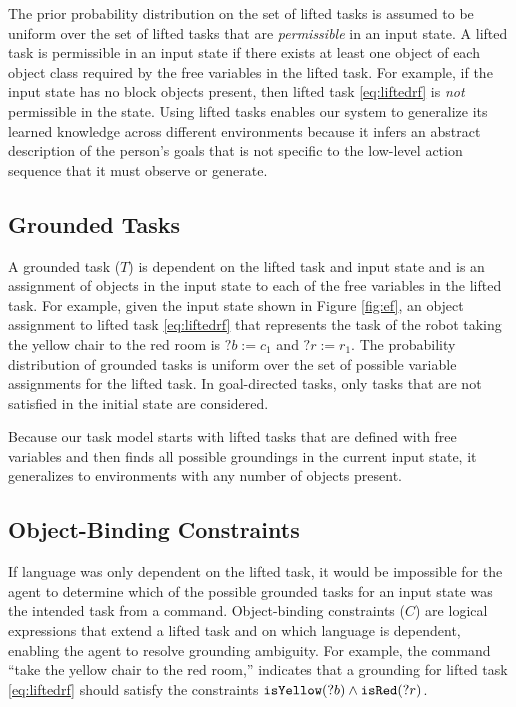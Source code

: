 \documentclass[conference]{IEEEtran}
\begin{document}
The prior probability distribution on the set of lifted tasks is assumed to be uniform over the set of lifted tasks that are {\em permissible} in an input state. A lifted task is permissible in an input state if there exists at least one object of each object class required by the free variables in the lifted task. For example, if the input state has no block objects present, then lifted task \ref{eq:liftedrf} is {\em not} permissible in the state. Using lifted tasks enables our system to generalize its learned knowledge across different environments because it infers an abstract description of the person's goals that is not specific to the low-level action sequence that it must observe or generate.

\subsection{Grounded Tasks}
A grounded task ($T$) is dependent on the lifted task and input state and is an assignment of objects in the input state to each of the free variables in the lifted task. For example, given the input state shown in Figure \ref{fig:ef}, an object assignment to lifted task \ref{eq:liftedrf} that represents the task of the robot taking the yellow chair to the red room is $?b:=c_1$ and $?r:=r_1$. The probability distribution of grounded tasks is uniform over the set of possible variable assignments for the lifted task. In goal-directed tasks, only tasks that are not satisfied in the initial state are considered.

Because our task model starts with lifted tasks that are defined with free variables and then finds all possible groundings in the current input state, it generalizes to environments with any number of objects present.

\subsection{Object-Binding Constraints}
If language was only dependent on the lifted task, it would be impossible for the agent to determine which of the possible grounded tasks for an input state was the intended task from a command.
Object-binding constraints ($C$) are logical expressions that extend a lifted task and on which language is dependent, enabling the agent to resolve grounding ambiguity. 
For example, the command ``take the yellow chair to the red room,'' indicates that a grounding for lifted task \ref{eq:liftedrf} should satisfy the constraints ${\tt isYellow}(?b) \land {\tt isRed}(?r)$.
\end{document}
